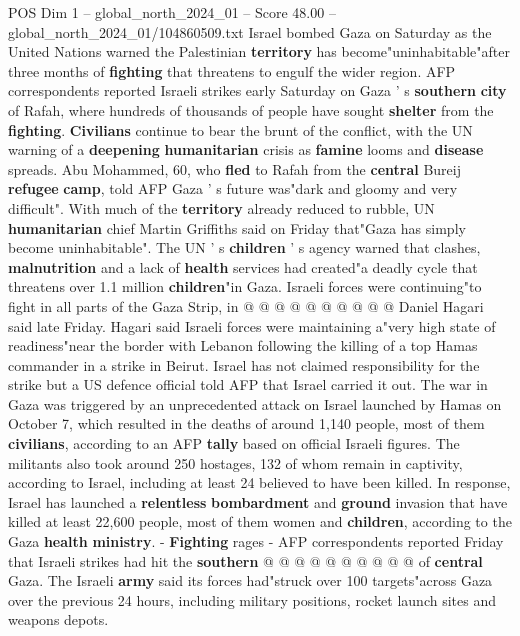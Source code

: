 \begin{textsample}{POS Dim 1 – global\_north\_2024\_01 – Score 48.00 – global\_north\_2024\_01/104860509.txt}  \label{ex:f1_pos_151}
Israel bombed Gaza on Saturday as the United Nations warned the Palestinian \textbf{territory} has become"uninhabitable"after three months of \textbf{fighting} that threatens to engulf the wider region.
AFP correspondents reported Israeli strikes early Saturday on Gaza ' s \textbf{southern} \textbf{city} of Rafah, where hundreds of thousands of people have sought \textbf{shelter} from the \textbf{fighting}. \textbf{Civilians} continue to bear the brunt of the conflict, with the UN warning of a \textbf{deepening} \textbf{humanitarian} crisis as \textbf{famine} looms and \textbf{disease} spreads.
Abu Mohammed, 60, who \textbf{fled} to Rafah from the \textbf{central} Bureij \textbf{refugee} \textbf{camp}, told AFP Gaza ' s future was"dark and gloomy and very difficult".
With much of the \textbf{territory} already reduced to rubble, UN \textbf{humanitarian} chief Martin Griffiths said on Friday that"Gaza has simply become uninhabitable".
The UN ' s \textbf{children} ' s agency warned that clashes, \textbf{malnutrition} and a lack of \textbf{health} services had created"a deadly cycle that threatens over 1.1 million \textbf{children}"in Gaza.
Israeli forces were continuing"to fight in all parts of the Gaza Strip, in @ @ @ @ @ @ @ @ @ @ Daniel Hagari said late Friday.
Hagari said Israeli forces were maintaining a"very high state of readiness"near the border with Lebanon following the killing of a top Hamas commander in a strike in Beirut.
Israel has not claimed responsibility for the strike but a US defence official told AFP that Israel carried it out.
The war in Gaza was triggered by an unprecedented attack on Israel launched by Hamas on October 7, which resulted in the deaths of around 1,140 people, most of them \textbf{civilians}, according to an AFP \textbf{tally} based on official Israeli figures.
The militants also took around 250 hostages, 132 of whom remain in captivity, according to Israel, including at least 24 believed to have been killed.
In response, Israel has launched a \textbf{relentless} \textbf{bombardment} and \textbf{ground} invasion that have killed at least 22,600 people, most of them women and \textbf{children}, according to the Gaza \textbf{health} \textbf{ministry}. - \textbf{Fighting} rages - AFP correspondents reported Friday that Israeli strikes had hit the \textbf{southern} @ @ @ @ @ @ @ @ @ @ of \textbf{central} Gaza.
The Israeli \textbf{army} said its forces had"struck over 100 targets"across Gaza over the previous 24 hours, including military positions, rocket launch sites and weapons depots.

\end{textsample}
